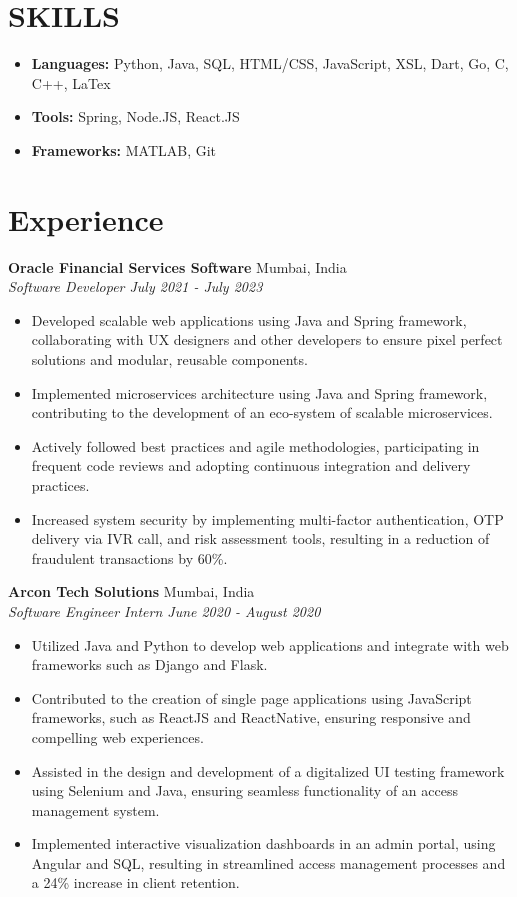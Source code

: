 \documentclass[a4paper,9pt]{extarticle}
\begin{document}
    \section*{SKILLS}
	\begin{itemize}
    \item \textbf{Languages: }Python, Java, SQL, HTML/CSS, JavaScript, XSL, Dart, Go, C, C++, LaTex\item \textbf{Tools: }Spring, Node.JS, React.JS\item \textbf{Frameworks: }MATLAB, Git\end{itemize}\section*{Experience}
    \noindent
    \textbf{Oracle Financial Services Software} \hfill Mumbai, India\\
    \textit{{Software Developer} \hfill July 2021 - July 2023}
    \begin{itemize}
    \item {Developed scalable web applications using Java and Spring framework, collaborating with UX designers and other developers to ensure pixel perfect solutions and modular, reusable components.}\item {Implemented microservices architecture using Java and Spring framework, contributing to the development of an eco-system of scalable microservices.}\item {Actively followed best practices and agile methodologies, participating in frequent code reviews and adopting continuous integration and delivery practices.}\item {Increased system security by implementing multi-factor authentication, OTP delivery via IVR call, and risk assessment tools, resulting in a reduction of fraudulent transactions by 60\%.}\end{itemize}
    \noindent
    \textbf{Arcon Tech Solutions} \hfill Mumbai, India\\
    \textit{{Software Engineer Intern} \hfill June 2020 - August 2020}
    \begin{itemize}
    \item {Utilized Java and Python to develop web applications and integrate with web frameworks such as Django and Flask.}\item {Contributed to the creation of single page applications using JavaScript frameworks, such as ReactJS and ReactNative, ensuring responsive and compelling web experiences.}\item {Assisted in the design and development of a digitalized UI testing framework using Selenium and Java, ensuring seamless functionality of an access management system.}\item {Implemented interactive visualization dashboards in an admin portal, using Angular and SQL, resulting in streamlined access management processes and a 24\% increase in client retention.}\end{itemize}
\end{document}
